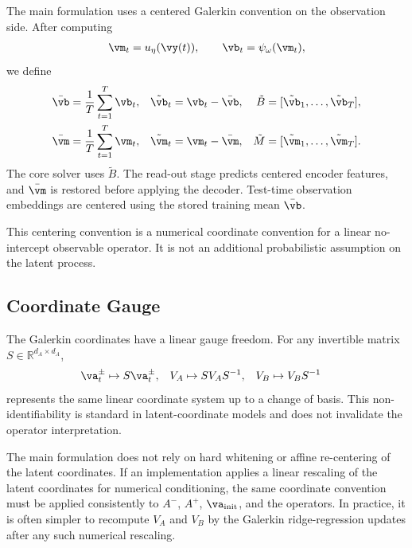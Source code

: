 \documentclass[twoside,11pt]{article}
\begin{document}
The main formulation uses a centered Galerkin convention on the
observation side. After computing
\begin{align}
\vm_t
=
u_\eta(\vy(t)),
\qquad
\vb_t
=
\psi_\omega(\vm_t),
\end{align}
we define
\begin{align}
\bar{\vb}
&=
\frac1T\sum_{t=1}^T \vb_t,
&
\tilde{\vb}_t
&=
\vb_t-\bar{\vb},
&
\tilde B
&=
[\tilde{\vb}_1,\dots,\tilde{\vb}_T],
\label{eq:app_centered_observation_embeddings}
\\
\bar{\vm}
&=
\frac1T\sum_{t=1}^T \vm_t,
&
\tilde{\vm}_t
&=
\vm_t-\bar{\vm},
&
\tilde M
&=
[\tilde{\vm}_1,\dots,\tilde{\vm}_T].
\label{eq:app_centered_encoder_features}
\end{align}
The core solver uses $\tilde B$. The read-out stage predicts centered
encoder features, and $\bar{\vm}$ is restored before applying the
decoder. Test-time observation embeddings are centered using the stored
training mean $\bar{\vb}$.

This centering convention is a numerical coordinate convention for a
linear no-intercept observable operator. It is not an additional
probabilistic assumption on the latent process.

\subsection{Coordinate Gauge}

The Galerkin coordinates have a linear gauge freedom. For any invertible
matrix $S\in\mathbb R^{d_A\times d_A}$,
\begin{align}
\va_t^\pm
&\mapsto
S\va_t^\pm,
&
V_A
&\mapsto
S V_A S^{-1},
&
V_B
&\mapsto
V_B S^{-1}
\end{align}
represents the same linear coordinate system up to a change of basis.
This non-identifiability is standard in latent-coordinate models and
does not invalidate the operator interpretation.

The main formulation does not rely on hard whitening or affine
re-centering of the latent coordinates. If an implementation applies a
linear rescaling of the latent coordinates for numerical conditioning,
the same coordinate convention must be applied consistently to
$A^-$, $A^+$, $\va_{\mathrm{init}}$, and the operators. In practice, it
is often simpler to recompute $V_A$ and $V_B$ by the Galerkin
ridge-regression updates after any such numerical rescaling.



\vskip 0.2in

\end{document}
